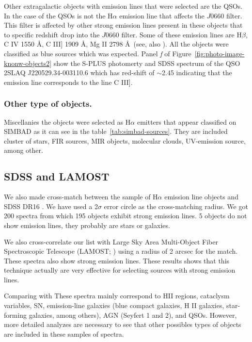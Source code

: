\documentclass[fleqn,usenatbib]{mnras}
\begin{document}
Other extragalactic objects with emission lines that were selected are the
QSOs. In the case of the QSOs is not the H{$\alpha$} emission line that affects
 the $J$0660 filter. This filter is affected by other strong emission lines present in
these objects that to specific redshift drop into the $J$0660 filter.
Some of these emission lines are H{$\beta$}, C {\sc IV} 1550 \AA, C {\sc III]} 1909 \AA,
  Mg {\sc II} 2798 \AA~(see, also \citealp{Gutierrez:2020, Nakazono:2021}).
  All the objects were classified as blue sources which was expected. Panel \textit{f} of
  Figure~\ref{fig:photo-image-knonw-objects2} show the S-PLUS photomerty and SDSS 
  spectrum of the QSO 2SLAQ J220529.34-003110.6
  which has red-shift of $\sim$2.45 indicating that the emission line corresponds to
  the line C {\sc III]}.
  
\subsubsection{Other type of objects.}
  
  Miscellanies the objects were selected as H{$\alpha$} emitters that appear classified on
  SIMBAD as it can see in the table~\ref{tab:simbad-sources}. They are included cluster of stars, 
  FIR sources, MIR objects, molecular clouds, UV-emission source, among other.

\subsection{SDSS and LAMOST}

We also made cross-match between the sample of H{$\alpha$} emission line objects and SDSS DR16
\citep{Ahumada:2020}. We have used a 2$\sigma$ error circle as the cross-matching radius.
We got 200 spectra from which 195 objects exhibit strong emission lines. 5 objects do not 
show emission lines, they probably are stars or galaxies.

We also cross-correlate our list with Large Sky Area Multi-Object Fiber Spectroscopic Telescope
(LAMOST; \citealp{Wu:2011}) using a radius of 2 arcsec for the match.  These spectra also
show strong emission lines. These results shows that this technique actually are very effective
for selecting sources with strong emission lines.

Comparing with These spectra mainly correspond to HII regions, cataclysm variables, SN, emission-line galaxies 
(blue compact galaxies, H II galaxies, star-forming galaxies, among others), AGN (Seyfert 1 and 2), and QSOs. 
However, more detailed analyzes are necessary to see that other possibles types 
of objects are included in these samples of spectra.
\end{document}
